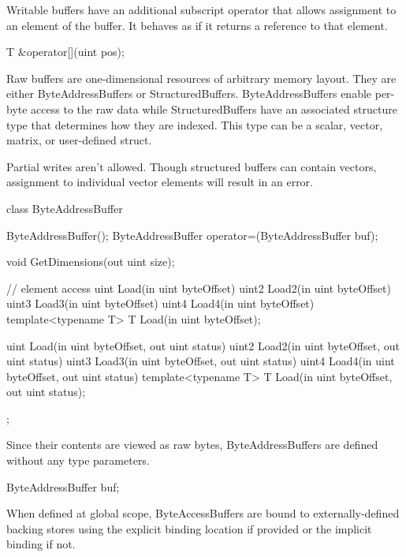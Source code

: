 Writable buffers have an additional subscript operator that allows assignment to an element of the buffer.
It behaves as if it returns a reference to that element.
\begin{HLSL}
 T &operator[](uint pos);
\end{HLSL}


Raw buffers are one-dimensional resources of arbitrary memory layout.
They are either ByteAddressBuffers or StructuredBuffers.
ByteAddressBuffers enable per-byte access to the raw data while
StructuredBuffers have an associated structure type that determines how they are
indexed. This type can be a scalar, vector, matrix, or user-defined struct.

Partial writes aren't allowed.
Though structured buffers can contain vectors,
assignment to individual vector elements will result in an error.


\begin{HLSL}
 class ByteAddressBuffer {

   ByteAddressBuffer();
   ByteAddressBuffer operator=(ByteAddressBuffer buf);

   void GetDimensions(out uint size);

   // element access
   uint Load(in uint byteOffset)
   uint2 Load2(in uint byteOffset)
   uint3 Load3(in uint byteOffset)
   uint4 Load4(in uint byteOffset)
   template<typename T>
   T Load(in uint byteOffset);

   uint Load(in uint byteOffset, out uint status)
   uint2 Load2(in uint byteOffset, out uint status)
   uint3 Load3(in uint byteOffset, out uint status)
   uint4 Load4(in uint byteOffset, out uint status)
   template<typename T>
   T Load(in uint byteOffset, out uint status);
};
\end{HLSL}


Since their contents are viewed as raw bytes, ByteAddressBuffers are defined without any type parameters.
\begin{HLSL}
  ByteAddressBuffer buf;
\end{HLSL}

When defined at global scope, ByteAccessBuffers are bound to externally-defined backing stores
using the explicit binding location if provided or the implicit binding if not.

